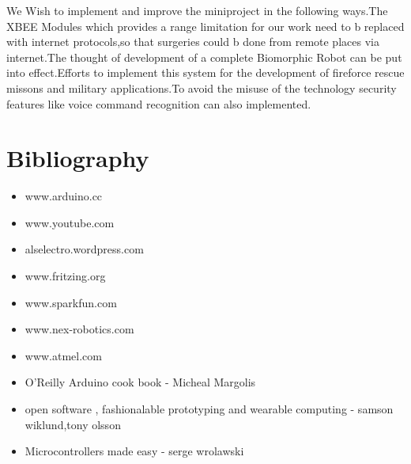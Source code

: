 \documentclass[a4paper, 12pt, notitlepage]{report}
\begin{document}
We Wish to implement and improve the miniproject in the following ways.The XBEE Modules which provides a range limitation for our work need to b replaced with internet protocols,so that surgeries could b done from remote places via internet.The thought of development of a complete Biomorphic Robot can be put into effect.Efforts to implement this system for the development of fireforce rescue missons and military applications.To avoid the misuse of the technology security features like voice command recognition can also implemented.
 

\chapter{Bibliography}
%
\begin{description}

\begin{itemize}

\item www.arduino.cc
\item www.youtube.com
\item alselectro.wordpress.com
\item www.fritzing.org
\item www.sparkfun.com
\item www.nex-robotics.com
\item www.atmel.com

\item O'Reilly Arduino cook book  - Micheal Margolis

\item open software , fashionalable prototyping and wearable computing - samson wiklund,tony olsson

\item Microcontrollers made easy - serge wrolawski

\end{itemize}

\item 

\end{description}
\end{document}
